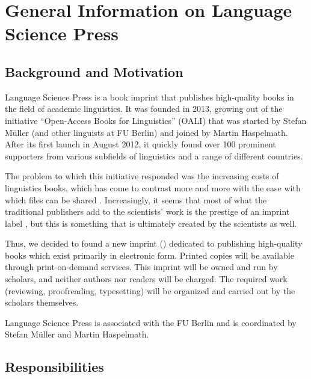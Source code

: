 \chapter{General Information on Language Science Press}


\section{Background and Motivation}

Language Science Press is a book imprint that publishes high-quality books in the field of academic linguistics. It was founded in 2013, growing out of the initiative ``Open-Access Books for Linguistics'' (OALI) that was started by Stefan Müller (and other linguists at FU Berlin) and joined by Martin Haspelmath. After its first launch in August 2012, it quickly found over 100 prominent supporters from various subfields of linguistics and a range of different countries.

The problem to which this initiative responded was the increasing costs of linguistics books, which has come to contrast more and more with the ease with which files can be shared \citep{MuellerOA}. Increasingly, it seems that most of what the traditional publishers add to the scientists' work is the prestige of an imprint label \citep{Haspelmath2012a}, but this is something that is ultimately created by the scientists as well.

Thus, we decided to found a new imprint (\lsp) dedicated to publishing high-quality books which exist primarily in electronic form. Printed copies will be available through print-on-demand services. This imprint will be owned and run by scholars, and neither authors nor readers will be charged. The required work (reviewing, proofreading, typesetting) will be organized and carried out by the scholars themselves.

Language Science Press is associated with the FU Berlin and is coordinated by Stefan Müller and Martin Haspelmath.




\section{Responsibilities}


